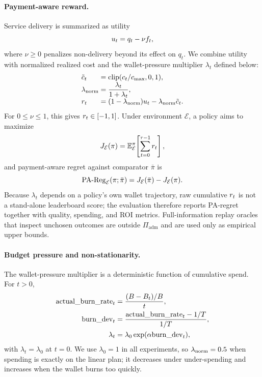 \paragraph{Payment-aware reward.}
Service delivery is summarized as utility
\begin{equation}
\label{eq:utility}
u_t=q_t-\nu f_t ,
\end{equation}
where $\nu\ge0$ penalizes non-delivery beyond its effect on $q_t$. We combine utility with normalized realized cost and the wallet-pressure multiplier $\lambda_t$ defined below:
\begin{equation}
\label{eq:reward}
\begin{array}{@{}l@{\;}c@{\;}l@{}}
\ctilde & = & \mathrm{clip}(c_t/c_{\max},0,1),\\
\lamn   & = & \dfrac{\lambda_t}{1+\lambda_t},\\
\rt     & = & (1-\lamn)\ut-\lamn\ctilde .
\end{array}
\end{equation}
For $0\le\nu\le1$, this gives $r_t\in[-1,1]$. Under environment $\mathcal{E}$, a policy aims to maximize
\begin{equation}
\label{eq:objective}
J_{\mathcal{E}}(\pi)=\mathbb{E}^{\pi}_{\mathcal{E}}\!\left[\sum_{t=0}^{\tau-1}r_t\right],
\end{equation}
and payment-aware regret against comparator $\bar\pi$ is
\begin{equation}
\label{eq:pa-regret}
\mathrm{PA\text{-}Reg}_{\mathcal{E}}(\pi;\bar\pi)=J_{\mathcal{E}}(\bar\pi)-J_{\mathcal{E}}(\pi).
\end{equation}
Because $\lambda_t$ depends on a policy's own wallet trajectory, raw cumulative $r_t$ is not a stand-alone leaderboard score; the evaluation therefore reports PA-regret together with quality, spending, and ROI metrics. Full-information replay oracles that inspect unchosen outcomes are outside $\Pi_{\mathrm{adm}}$ and are used only as empirical upper bounds.

\paragraph{Budget pressure and non-stationarity.}
The wallet-pressure multiplier is a deterministic function of cumulative spend. For $t>0$,
\begin{equation}
\label{eq:lambda}
\begin{aligned}
\mathrm{actual\_burn\_rate}_t&=\frac{(B-B_t)/B}{t},\\
\mathrm{burn\_dev}_t&=\frac{\mathrm{actual\_burn\_rate}_t-1/T}{1/T},\\
\lambda_t&=\lambda_0\exp(\alpha\mathrm{burn\_dev}_t),
\end{aligned}
\end{equation}
with $\lambda_t=\lambda_0$ at $t=0$. We use $\lambda_0=1$ in all experiments, so $\lambda_{\mathrm{norm}}=0.5$ when spending is exactly on the linear plan; it decreases under under-spending and increases when the wallet burns too quickly.


